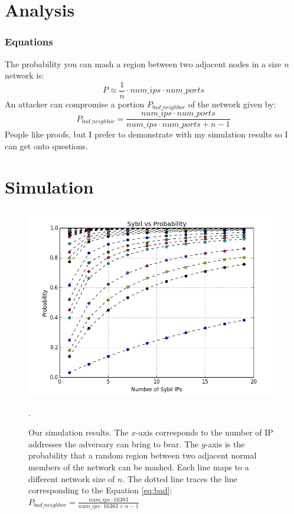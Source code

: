 \documentclass[11pt]{beamer}
\begin{document}
    \section{Analysis}
    \begin{frame}
        \frametitle{Equations}
        The probability you can mash a region between two adjacent nodes in a size $n$ network is:
         \begin{equation}
        P \approx \frac{1}{n}\cdot num\_ips \cdot num\_ports
        \end{equation}
        An attacker can compromise a portion $ P_{bad\_neighbor} $ of the network given by:
        \begin{equation}
        P_{bad\_neighbor} =  \frac{num\_ips \cdot num\_ports}{num\_ips \cdot num\_ports + n - 1}
        \label{eq:bad}
        \end{equation}
        People like proofs, but I prefer to demonstrate with my simulation results so I can get onto questions.
        
    \end{frame}
    
    \section{Simulation}
    \begin{frame}
        \begin{figure}
            \centering
            \includegraphics[width=0.65\linewidth]{ip_prob_all}
            \caption[foo]{Our simulation results.  
                The $x$-axis corresponds to the number of IP addresses the adversary can bring to bear.
                The $y$-axis is the probability that a random region between two adjacent normal members of the network can be mashed.
                Each line maps to a different network size of $n$.
                The dotted line traces the line corresponding to the Equation \ref{eq:bad}: $ P_{bad\_neighbor} =  \frac{num\_ips \cdot 16383}{num\_ips \cdot 16383 + n - 1}$}.
            \label{fig:exp2}
        \end{figure}
    \end{frame}
    
\end{document}
